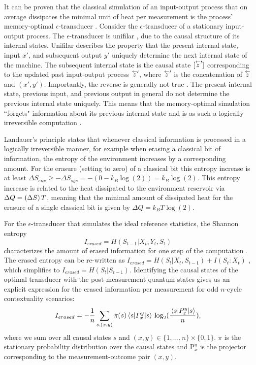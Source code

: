 It can be proven that the classical simulation of an input-output process that on average dissipates the minimal unit of heat per measurement is the process' memory-optimal $\epsilon$-transducer \cite{Cabello2016}. Consider the $\epsilon$-transducer of a stationary input-output process. The $\epsilon$-transducer is unifilar \cite{Barnett2015}, due to the causal structure of its internal states. Unifilar describes the property that the present internal state, input $x'$, and subsequent output $y'$ uniquely determine the next internal state of the machine. The subsequent internal state is the causal state $[\oset{\leftarrow}{z}']$ corresponding to the updated past input-output process $\oset{\leftarrow}{z}'$, where $\oset{\leftarrow}{z}'$ is the concatenation of $\oset{\leftarrow}{z}$ and $(x',y')$. Importantly, the reverse is generally not true \cite{Wiesner2012}. The present internal state, previous input, and previous output in general do not determine the previous internal state uniquely. This means that the memory-optimal simulation ``forgets" information about its previous internal state and is as such a logically irreversible computation \cite{Wiesner2012}.

Landauer's principle states that whenever classical information is processed in a logically irreversible manner, for example when erasing a classical bit of information, the entropy of the environment increases by a corresponding amount. For the erasure (setting to zero) of a classical bit this entropy increase is at least $\Delta S_{env}\geq -\Delta S_{sys} = -(0-k_B\log(2))=k_B\log(2)$. This entropy increase is related to the heat dissipated to the environment reservoir via $\Delta Q= (\Delta S)\thinspace T$, meaning that the minimal amount of dissipated heat for the erasure of a single classical bit is given by $\Delta Q = k_B T \log(2)$.

For the $\epsilon$-transducer that simulates the ideal reference statistics, the Shannon entropy 
\begin{equation}
I_{erased}=H(S_{t-1}\vert X_t,Y_t,S_t)
\end{equation} 
characterizes the amount of erased information for one step of the computation \cite{Wiesner2012}. The erased entropy can be re-written as $I_{erased}=H(S_t\vert X_t, S_{t-1})+I(S_t:X_t)$ \cite{Wiesner2012}, which simplifies to $I_{erased}=H(S_t\vert S_{t-1})$. Identifying the causal states of the optimal transducer with the post-measurement quantum states gives us an explicit expression for the erased information per measurement for odd $n$-cycle contextuality scenarios:
\begin{equation}
I_{erased}= -\frac{1}{n} \sum_{s,(x,y)} \pi(s) \expval{P_x^y}{s}\thinspace\log_2(\frac{\expval{P_x^y}{s}}{n}),    
\end{equation}
where we sum over all causal states $s$ and $(x,y)\in\{1,\dots,n\}\times\{0,1\}$. $\pi$ is the stationary probability distribution over the causal states and $\text{P}_x^y$ is the projector corresponding to the measurement-outcome pair $(x,y)$.

